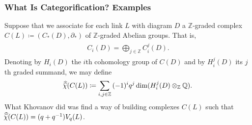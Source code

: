 \documentclass{beamer}
\begin{document}
\begin{frame}
\frametitle{What Is Categorification? Examples}
Suppose that we associate for each link $L$ with diagram $D$ a $\mathbb{Z}$-graded complex $C(L) \coloneqq (C_*(D), \partial_*)$ of $\mathbb{Z}$-graded Abelian groups. That is,
\begin{align*}
\begin{split}
C_i(D) = \bigoplus_{j \in \mathbb{Z}}{C_i^j(D)}.
\end{split}
\end{align*}
Denoting by $H_i(D)$ the $i$th cohomology group of $C(D)$ and by $H_i^j(D)$ its $j$th graded summand, we may define
\begin{align*}
\begin{split}
\widehat{\vphantom{\rule{1pt}{6.5pt}}\smash{\widehat{\!\chi}}}(C(L)) \coloneqq \sum_{i,j \in \mathbb{Z}}{(-1)^iq^j\dim(H_i^j(D) \otimes_\mathbb{Z} \mathbb{Q})}.
\end{split}
\end{align*}
What Khovanov did was find a way of building complexes $C(L)$ such that $\widehat{\vphantom{\rule{1pt}{6.5pt}}\smash{\widehat{\!\chi}}}(C(L)) = (q + q^{-1})V_q(L)$.
\end{frame}
\end{document}
